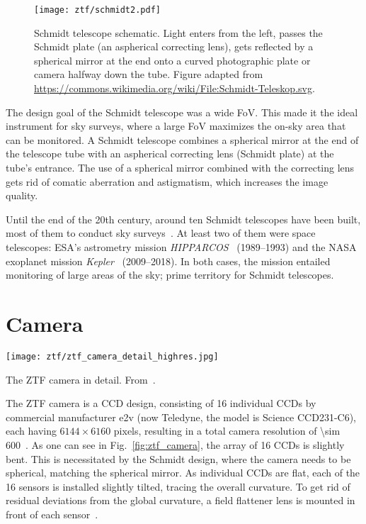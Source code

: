 \begin{figure}[htb]
    \texttt{[image: ztf/schmidt2.pdf]}
    \caption[Schmidt telescope schematic]{Schmidt telescope schematic. Light enters from the left, passes the Schmidt plate (an aspherical correcting lens), gets reflected by a spherical mirror at the end onto a curved photographic plate or camera halfway down the tube. Figure adapted from \url{https://commons.wikimedia.org/wiki/File:Schmidt-Teleskop.svg}.}
\end{figure}

The design goal of the Schmidt telescope was a wide FoV. This made it the ideal instrument for sky surveys, where a large FoV maximizes the on-sky area that can be monitored. A Schmidt telescope combines a spherical mirror at the end of the telescope tube with an aspherical correcting lens (Schmidt plate) at the tube's entrance. The use of a spherical mirror combined with the correcting lens gets rid of comatic aberration and astigmatism, which increases the image quality.

Until the end of the 20th century, around ten Schmidt telescopes have been built, most of them to conduct sky surveys~. At least two of them were space telescopes: ESA's astrometry mission \textit{HIPPARCOS}~ (1989--1993) and the NASA exoplanet mission \textit{Kepler}~ (2009--2018). In both cases, the mission entailed monitoring of large areas of the sky; prime territory for Schmidt telescopes.

\section{Camera}
\begin{marginfigure}
    \texttt{[image: ztf/ztf\_camera\_detail\_highres.jpg]}
    \caption[ZTF camera cutaway]{The ZTF camera in detail. From~\cite{Dekany2020}.}
\end{marginfigure}
The ZTF camera is a CCD design, consisting of 16 individual CCDs by commercial manufacturer e2v (now Teledyne, the model is Science CCD231-C6), each having $6144\times6160$ pixels, resulting in a total camera resolution of \SI{\sim 600}{\mpix}~. As one can see in Fig.~\ref{fig:ztf_camera}, the array of 16 CCDs is slightly bent. This is necessitated by the Schmidt design, where the camera needs to be spherical, matching the spherical mirror. As individual CCDs are flat, each of the 16 sensors is installed slightly tilted, tracing the overall curvature. To get rid of residual deviations from the global curvature, a field flattener lens is mounted in front of each sensor~.

